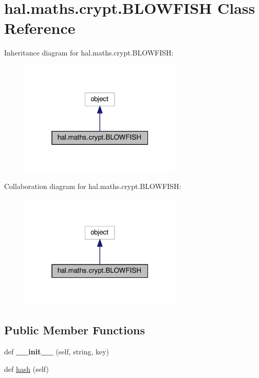 \hypertarget{classhal_1_1maths_1_1crypt_1_1_b_l_o_w_f_i_s_h}{}\section{hal.\+maths.\+crypt.\+B\+L\+O\+W\+F\+I\+SH Class Reference}
\label{classhal_1_1maths_1_1crypt_1_1_b_l_o_w_f_i_s_h}


Inheritance diagram for hal.\+maths.\+crypt.\+B\+L\+O\+W\+F\+I\+SH\+:
\nopagebreak
\begin{figure}[H]
\begin{center}
\leavevmode
\includegraphics[width=220pt]{classhal_1_1maths_1_1crypt_1_1_b_l_o_w_f_i_s_h__inherit__graph}
\end{center}
\end{figure}


Collaboration diagram for hal.\+maths.\+crypt.\+B\+L\+O\+W\+F\+I\+SH\+:
\nopagebreak
\begin{figure}[H]
\begin{center}
\leavevmode
\includegraphics[width=220pt]{classhal_1_1maths_1_1crypt_1_1_b_l_o_w_f_i_s_h__coll__graph}
\end{center}
\end{figure}
\subsection*{Public Member Functions}
\begin{DoxyCompactItemize}
\item 
def {\bfseries \+\_\+\+\_\+init\+\_\+\+\_\+} (self, string, key)\hypertarget{classhal_1_1maths_1_1crypt_1_1_b_l_o_w_f_i_s_h_a0428f1f9b864c84c1911d61235e739fc}{}\label{classhal_1_1maths_1_1crypt_1_1_b_l_o_w_f_i_s_h_a0428f1f9b864c84c1911d61235e739fc}

\item 
def \hyperlink{classhal_1_1maths_1_1crypt_1_1_b_l_o_w_f_i_s_h_a7581e9c15acfe4cb64c88c215193f65a}{hash} (self)
\end{DoxyCompactItemize}
